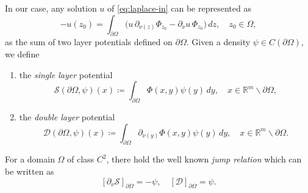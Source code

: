 \documentclass[10pt, a4paper, twoside, openright]{article}
\numberwithin{equation}{section}
\theoremstyle{definition}
\theoremstyle{plain}
\theoremstyle{plain}
\theoremstyle{plain}
\newtheorem{proposition}[subsection]{Proposition}
\theoremstyle{plain}
\theoremstyle{plain}
\theoremstyle{plain}
\theoremstyle{plain}
\theoremstyle{plain}
\begin{document}
In our case, any solution $u$ of \eqref{eq:laplace-in} can be represented as
\begin{equation}
  \label{eq:representation-formula-harmonics}
  - u(z_0) = \int_{\partial \Omega}\big(u\, \partial_{\nu(z)} \Phi_{z_0}
  - \partial_\nu u\,\Phi_{z_0}\big)\,dz, \quad z_0 \in \Omega,
\end{equation}
as the sum of two layer potentials defined on $\partial\Omega$.
Given a density $\psi\in C(\partial \Omega)$, we define
\begin{enumerate}
  \item the \emph{single layer} potential
   \begin{equation}
    \mathcal{S}(\partial \Omega,\psi)(x)\coloneqq \int_{\partial \Omega} \Phi(x, y)\psi(y)\, dy,\quad x\in\mathbb{R}^m \backslash\partial \Omega, \label{eq:definition-single-layer}
   \end{equation}
  \item the \emph{double layer} potential
   \begin{equation}
    \mathcal{D}(\partial \Omega,\psi)(x)\coloneqq \int_{\partial \Omega} \partial_{\nu(y)}\Phi(x, y)\psi(y)\, dy,\quad x\in\mathbb{R}^m \backslash\partial \Omega. \label{eq:definition-double-layer}
   \end{equation}
\end{enumerate}
For a domain $\Omega$ of class $C^2$, there hold the well known \emph{jump relation}
which can be written as
\begin{equation}
\label{eq:jump-relations}
 [\partial_\nu\mathcal{S}]_{\partial \Omega} = -\psi,
 \quad
 [\mathcal{D}]_{\partial \Omega} = \psi.
\end{equation}
\end{document}
